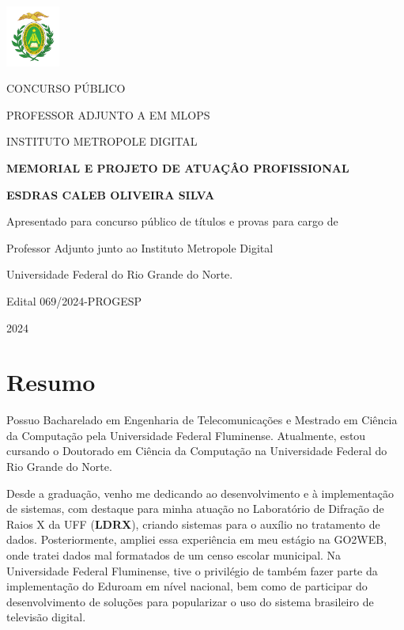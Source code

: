 \documentclass[10pt,a4paper,oneside]{book}
\newcommand{\Year}{2024}
\newcommand{\Author}{Esdras Caleb Oliveira Silva}
\newcommand{\UFF}{Universidade Federal Fluminense}
\newcommand{\UFRN}{Universidade Federal do Rio Grande do Norte}
\begin{document}
\pagestyle{plain}
\frontmatter

\begin{titlepage}
  \begin{center}
    \includegraphics[height=2cm]{images/logo.pdf}
    \vspace{1cm}

    CONCURSO PÚBLICO

    PROFESSOR ADJUNTO A EM MLOPS

    INSTITUTO METROPOLE DIGITAL
    \vspace{5cm}

    \textbf{\LARGE MEMORIAL E PROJETO DE ATUAÇÂO PROFISSIONAL}
    \vspace{1cm}

    \textbf{\LARGE \MakeUppercase{\Author{}}}
    \vspace{5cm}

    {\small
      Apresentado para concurso público de títulos e provas para cargo de

      Professor Adjunto junto ao Instituto Metropole Digital

      Universidade Federal do Rio Grande do Norte.
      \vspace{1cm}

      Edital 069/2024-PROGESP
    }
    \vfill

    \Year{}
  \end{center}
\end{titlepage}

\chapter*{Resumo}

Possuo Bacharelado em Engenharia de Telecomunicações e Mestrado em Ciência da Computação pela \UFF{}.
Atualmente, estou cursando o Doutorado em Ciência da Computação na \UFRN{}.

Desde a graduação, venho me dedicando ao desenvolvimento e à implementação de sistemas, com destaque para minha atuação
no Laboratório de Difração de Raios X da UFF (\textbf{LDRX}), criando sistemas para o auxílio no tratamento de dados.
Posteriormente, ampliei essa experiência em meu estágio na GO2WEB, onde tratei dados mal formatados de um censo escolar
municipal. Na \UFF{}, tive o privilégio de também fazer parte da implementação do Eduroam em nível nacional, bem como de
participar do desenvolvimento de soluções para popularizar o uso do sistema brasileiro de televisão digital.
\end{document}
